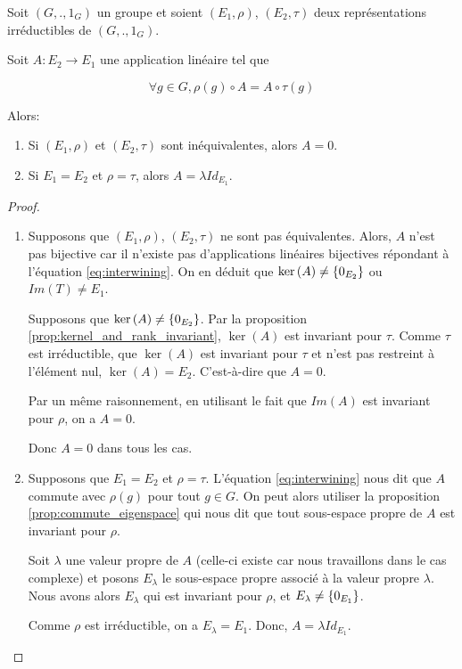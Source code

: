 \begin{proposition} 
	\label{lemma:shur_lemma_1}
	Soit $(G, ., 1_{G})$ un groupe et soient $(E_{1}, \rho)$,
	$(E_{2}, \tau)$
	deux représentations irréductibles de $(G, ., 1_{G})$.

	Soit $A : E_{2} \rightarrow E_{1}$ une application linéaire tel
	que

	\begin{equation}
		\label{eq:interwining}
		\forall g \in G, \rho(g) \circ A = A \circ \tau(g)
	\end{equation}

	Alors:
	\begin{enumerate}
		\item Si $(E_{1},
	\rho)$ et
	$(E_{2}, \tau)$ sont inéquivalentes,
	alors $A = 0$.

		\item Si $E_{1} = E_{2}$ et $\rho = \tau$, alors $A = \lambda
			Id_{E_{1}}$.
	\end{enumerate}
\end{proposition}

\ifdefined\outputproof
\begin{proof}
	\begin{enumerate}
		\item Supposons que $(E_{1},
			\rho)$,
			$(E_{2}, \tau)$ ne sont pas
			équivalentes. Alors, $A$ n'est pas bijective car il n'existe pas
			d'applications linéaires bijectives répondant à
			l'équation \ref{eq:interwining}. On en déduit que $\ker{(A)} \neq
			\left\{ 0_{E_{2}} \right\}$ ou $Im(T) \neq E_{1}$.

			Supposons que $\ker{(A)} \neq \left\{ 0_{E_{2}} \right\}$. Par la proposition
			\ref{prop:kernel_and_rank_invariant}, $\ker{(A)}$ est invariant pour $\tau$.
			Comme $\tau$ est irréductible, que $\ker{(A)}$ est invariant pour $\tau$ et
			n'est pas restreint à l'élément nul, $\ker{(A)} = E_{2}$. C'est-à-dire
			que $A = 0$.

			Par un même raisonnement, en utilisant le fait que $Im(A)$ est invariant
			pour $\rho$, on a $A = 0$.

			Donc $A = 0$ dans tous les cas.
		\item Supposons que $E_{1} = E_{2}$ et $\rho = \tau$.
			L'équation \ref{eq:interwining} nous dit que $A$ commute avec
			$\rho(g)$ pour tout $g \in G$. On peut alors utiliser la proposition
			\ref{prop:commute_eigenspace} qui nous dit que tout sous-espace
			propre de $A$ est invariant pour $\rho$.

			Soit $\lambda$ une valeur propre de $A$ (celle-ci existe car nous
			travaillons dans le cas complexe) et posons $E_{\lambda}$ le
			sous-espace propre associé à la valeur propre $\lambda$. Nous avons
			alors $E_{\lambda}$ qui est invariant pour $\rho$, et $E_{\lambda}
			\neq \left\{ 0_{E_{1}} \right\}$.

			Comme $\rho$ est irréductible, on a $E_{\lambda} = E_{1}$. Donc,
			$A = \lambda Id_{E_{1}}$.
	\end{enumerate}
\end{proof}
\fi


